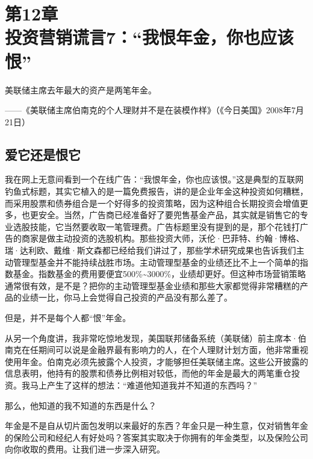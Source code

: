 
\section[第12章\q 投资营销谎言7：“我恨年金，你也应该恨”]{第12章\\ 投资营销谎言7：“我恨年金，你也应该恨”}

\begin{BookQuote}
美联储主席去年最大的资产是两笔年金。

\hfill ——《美联储主席伯南克的个人理财并不是在装模作样》（《今日美国》2008年7月21日）
\end{BookQuote}

\subsection{爱它还是恨它}

我在网上无意间看到一个在线广告：“我恨年金，你也应该恨。”这是典型的互联网钓鱼式标题，其实它植入的是一篇免费报告，讲的是企业年金这种投资如何糟糕，而采用股票和债券组合是一个好得多的投资策略，因为这种组合长期投资会增值更多，也更安全。当然，广告商已经准备好了要兜售基金产品，其实就是销售它的专业选股技能，它当然要收取一笔管理费。广告标题里没有提到的是，那个花钱打广告的商家是做主动投资的选股机构。那些投资大师，沃伦·巴菲特、约翰·博格、瑞·达利欧、戴维·斯文森都已经给我们讲过了，那些学术研究成果也告诉我们主动管理型基金并不能持续战胜市场。主动管理型基金的业绩还比不上一个简单的指数基金。指数基金的费用要便宜500\%\textasciitilde{}3000\%，业绩却更好。但这种市场营销策略通常很有效，是不是？把你的主动管理型基金业绩和那些大家都觉得非常糟糕的产品的业绩一比，你马上会觉得自己投资的产品没有那么差了。

但是，并不是每个人都“恨”年金。

从另一个角度讲，我非常吃惊地发现，美国联邦储备系统（美联储）前主席本·伯南克在任期间可以说是金融界最有影响力的人，在个人理财计划方面，他非常重视使用年金。伯南克必须先披露个人投资，才能够担任美联储主席。这些公开披露的信息表明，他持有的股票和债券比例相对较低，而他的年金是最大的两笔重仓投资。我马上产生了这样的想法：“难道他知道我并不知道的东西吗？”

那么，他知道的我不知道的东西是什么？

年金是不是自从切片面包发明以来最好的东西？年金只是一种生意，仅对销售年金的保险公司和经纪人有好处吗？答案其实取决于你拥有的年金类型，以及保险公司向你收取的费用。让我们进一步深入研究。

